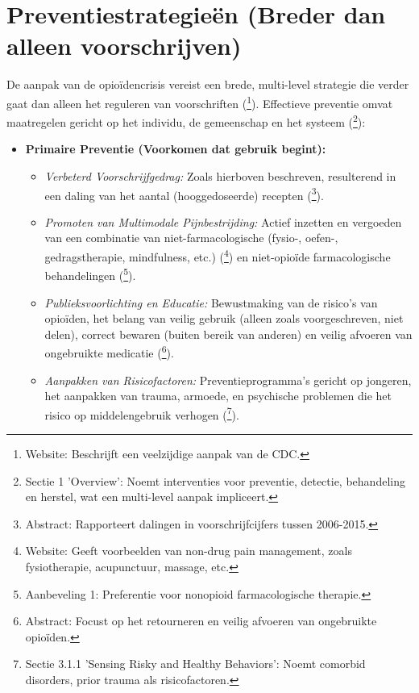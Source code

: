 \documentclass[11pt, a4paper]{report} %
\begin{document}
\section{Preventiestrategieën (Breder dan alleen voorschrijven)}
De aanpak van de opioïdencrisis vereist een brede, multi-level strategie die verder gaat dan alleen het reguleren van voorschriften (\cite{CDCPreventingOverdose}\footnote{Website: Beschrijft een veelzijdige aanpak van de CDC.}). Effectieve preventie omvat maatregelen gericht op het individu, de gemeenschap en het systeem (\cite{Yarosh2020ComputationalSupportSUD}\footnote{Sectie 1 'Overview': Noemt interventies voor preventie, detectie, behandeling en herstel, wat een multi-level aanpak impliceert.}):
\begin{itemize}
    \item \textbf{Primaire Preventie (Voorkomen dat gebruik begint):}
        \begin{itemize}
            \item \textit{Verbeterd Voorschrijfgedrag:} Zoals hierboven beschreven, resulterend in een daling van het aantal (hooggedoseerde) recepten (\cite{CDCVitalSigns2017}\footnote{Abstract: Rapporteert dalingen in voorschrijfcijfers tussen 2006-2015.}).
            \item \textit{Promoten van Multimodale Pijnbestrijding:} Actief inzetten en vergoeden van een combinatie van niet-farmacologische (fysio-, oefen-, gedragstherapie, mindfulness, etc.) (\cite{MedlinePlusNonDrugPain}\footnote{Website: Geeft voorbeelden van non-drug pain management, zoals fysiotherapie, acupunctuur, massage, etc.}) en niet-opioïde farmacologische behandelingen (\cite{Dowell2016CDCGuideline}\footnote{Aanbeveling 1: Preferentie voor nonopioid farmacologische therapie.}).
            \item \textit{Publieksvoorlichting en Educatie:} Bewustmaking van de risico's van opioïden, het belang van veilig gebruik (alleen zoals voorgeschreven, niet delen), correct bewaren (buiten bereik van anderen) en veilig afvoeren van ongebruikte medicatie (\cite{Hasan2022OptimizingReturnDisposalOpioids}\footnote{Abstract: Focust op het retourneren en veilig afvoeren van ongebruikte opioïden.}).
            \item \textit{Aanpakken van Risicofactoren:} Preventieprogramma's gericht op jongeren, het aanpakken van trauma, armoede, en psychische problemen die het risico op middelengebruik verhogen (\cite{Yarosh2020ComputationalSupportSUD}\footnote{Sectie 3.1.1 'Sensing Risky and Healthy Behaviors': Noemt comorbid disorders, prior trauma als risicofactoren.}).

\end{itemize}
\end{itemize}
\end{document}

